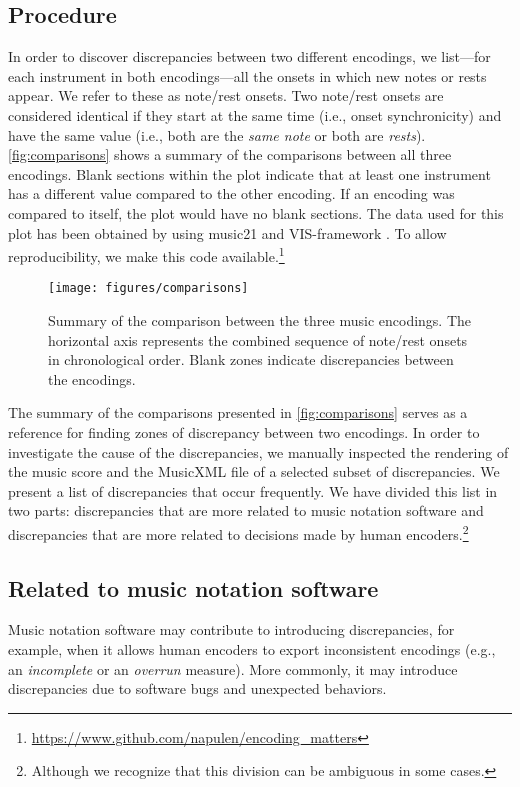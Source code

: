 \subsection{Procedure}
In order to discover discrepancies between two different encodings, we list---for each instrument in both encodings---all the onsets in which new notes or rests appear. We refer to these as note/rest onsets. Two note/rest onsets are considered identical if they start at the same time (i.e., onset synchronicity) and have the same value (i.e., both are the \emph{same note} or both are \emph{rests}). \autoref{fig:comparisons} shows a summary of the comparisons between all three encodings. Blank sections within the plot indicate that at least one instrument has a different value compared to the other encoding. If an encoding was compared to itself, the plot would have no blank sections. The data used for this plot has been obtained by using music21 \cite{cuthbert2010music21} and VIS-framework \cite{antila2014vis}. To allow reproducibility, we make this code available.\footnote{\url{https://www.github.com/napulen/encoding_matters}}

\begin{figure}[h]
\texttt{[image: figures/comparisons]}
\caption{Summary of the comparison between the three music encodings. The horizontal axis represents the combined sequence of note/rest onsets in chronological order. Blank zones indicate discrepancies between the encodings.}
\label{fig:comparisons}
\end{figure}

The summary of the comparisons presented in \autoref{fig:comparisons} serves as a reference for finding zones of discrepancy between two encodings. In order to investigate the cause of the discrepancies, we manually inspected the rendering of the music score and the MusicXML file of a selected subset of discrepancies. We present a list of discrepancies that occur frequently. We have divided this list in two parts: discrepancies that are more related to music notation software and discrepancies that are more related to decisions made by human encoders.\footnote{Although we recognize that this division can be ambiguous in some cases.}

\subsection{Related to music notation software}
Music notation software may contribute to introducing discrepancies, for example, when it allows human encoders to export inconsistent encodings (e.g., an \emph{incomplete} or an \emph{overrun} measure). More commonly, it may introduce discrepancies due to software bugs and unexpected behaviors.

